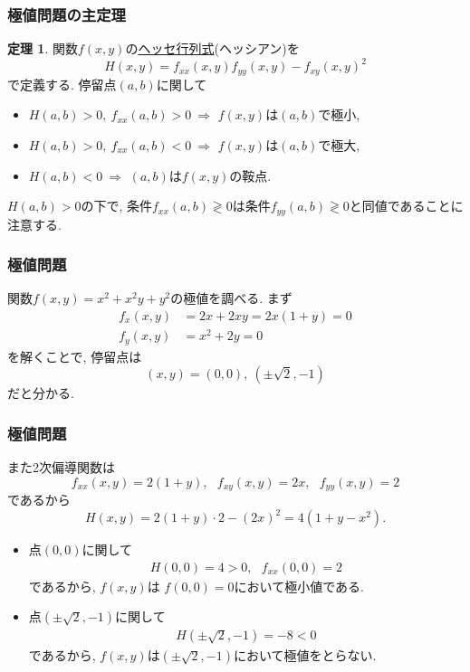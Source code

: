 \documentclass[dvipdfmx,cjk,10.2pt]{beamer}
\theoremstyle{definition}
\newtheorem{Thm}{定理}[section]
\begin{document}
\begin{frame}
\frametitle{極値問題の主定理}


\begin{Thm} \label{停留点とヘッセ行列}
関数$f(x,y)$の\underline{ヘッセ行列式}(ヘッシアン)を
$$
H(x,y)
=f_{xx}(x,y)f_{yy}(x,y)-f_{xy}(x,y)^2
$$
で定義する. 
停留点$(a,b)$に関して 
\begin{itemize}
\item $H(a,b)>0, \ f_{xx}(a,b)>0 \ \Longrightarrow$ $f(x,y)$は$(a,b)$で極小, 
\item $H(a,b)>0, \ f_{xx}(a,b)<0 \ \Longrightarrow$ $f(x,y)$は$(a,b)$で極大, 
\item $H(a,b)<0 \ \Longrightarrow$ $(a,b)$は$f(x,y)$の鞍点. 
\end{itemize}
\end{Thm}

$H(a,b)>0$の下で, 条件$f_{xx}(a,b) \gtrless 0$は条件$f_{yy}(a,b)\gtrless 0$と同値であることに注意する. 

\end{frame}





\begin{frame}
\frametitle{極値問題}

関数$f(x,y)=x^2+x^2y+y^2$の極値を調べる. まず
\begin{align*}
f_x(x,y) &= 2x+2xy=2x(1+y)=0\\ 
f_y(x,y) &= x^2+2y=0
\end{align*}
を解くことで, 停留点は
$$
(x,y)=(0,0), \ (\pm \sqrt{2},-1)
$$
だと分かる. 

\end{frame}




\begin{frame}
\frametitle{極値問題}
また2次偏導関数は
$$
f_{xx}(x,y)=2(1+y), \ \ \ f_{xy}(x,y)=2x, \ \ \ f_{yy}(x,y)=2
$$
であるから
$$
H(x,y)=2(1+y) \cdot 2 - (2x)^2=4(1+y-x^2). 
$$

\begin{itemize}
\item 点$(0,0)$に関して
\begin{align*}
H(0,0)=4>0, \ \ \ f_{xx}(0,0) = 2
\end{align*}
であるから, $f(x,y)$は $f(0,0)=0$において極小値である. 
\item 点$(\pm \sqrt{2},-1)$に関して
\begin{align*}
H(\pm \sqrt{2},-1)=-8<0
\end{align*}
であるから, $f(x,y)$は$(\pm\sqrt{2},-1)$において極値をとらない.  
\end{itemize}

\end{frame}
\end{document}
